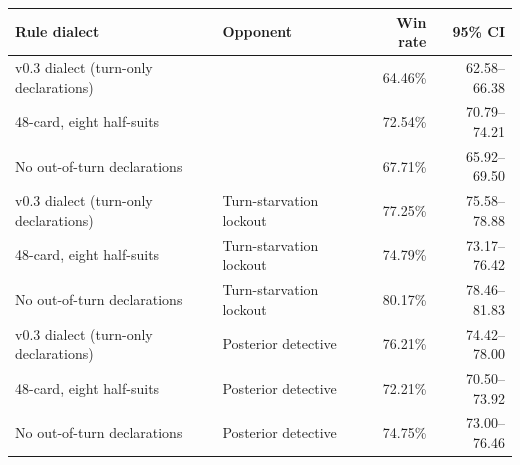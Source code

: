 \begin{tabular}{llrr}
\toprule
Rule dialect & Opponent & Win rate & 95\% CI \\
\midrule
v0.3 dialect (turn-only declarations) & \vthree{} & 64.46\% & 62.58--66.38 \\
48-card, eight half-suits & \vthree{} & 72.54\% & 70.79--74.21 \\
No out-of-turn declarations & \vthree{} & 67.71\% & 65.92--69.50 \\
v0.3 dialect (turn-only declarations) & Turn-starvation lockout & 77.25\% & 75.58--78.88 \\
48-card, eight half-suits & Turn-starvation lockout & 74.79\% & 73.17--76.42 \\
No out-of-turn declarations & Turn-starvation lockout & 80.17\% & 78.46--81.83 \\
v0.3 dialect (turn-only declarations) & Posterior detective & 76.21\% & 74.42--78.00 \\
48-card, eight half-suits & Posterior detective & 72.21\% & 70.50--73.92 \\
No out-of-turn declarations & Posterior detective & 74.75\% & 73.00--76.46 \\
\bottomrule
\end{tabular}